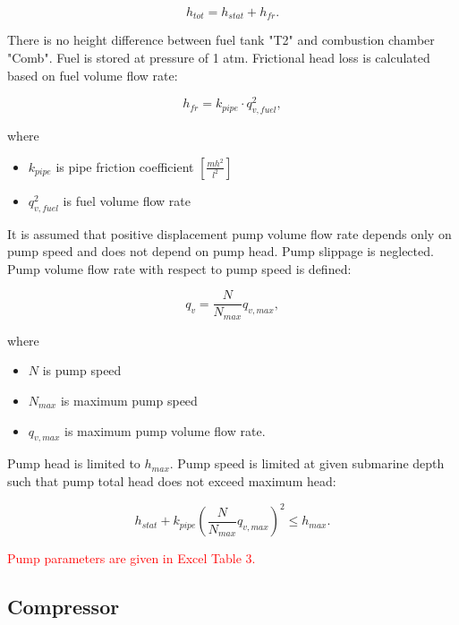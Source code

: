 \documentclass{article}
\begin{document}
	\begin{equation}\label{eq:head_total}
		h_{tot} = h_{stat} + h_{fr}.
	\end{equation}
	
	There is no height difference between fuel tank "T2" and combustion chamber 
	"Comb". Fuel is stored at pressure of 1 atm.
	Frictional head loss is calculated based on fuel volume flow rate:
	
	\begin{equation}\label{eq:head_loss}
		h_{fr} = k_{pipe} \cdot q_{v,fuel}^2,
	\end{equation}
	
	\noindent
	where
	
	\begin{itemize}
		\item $k_{pipe}$ is pipe friction coefficient $\left[ \frac{mh^2}{l^2} \right]$
		\item $q_{v,fuel}^2$ is fuel volume flow rate
	\end{itemize}

	\noindent
	It is assumed that positive displacement pump volume flow rate depends only on pump speed and does not depend on pump head. Pump slippage is neglected. Pump volume flow rate with respect to pump speed is defined:
	
	\begin{equation}\label{eq:pump_vol_flow}
		q_v = \frac{N}{N_{max}} q_{v,max},
	\end{equation}
	
	\noindent
	where
	
	\begin{itemize}
		\item $N$ is pump speed
		\item $N_{max}$ is maximum pump speed
		\item $q_{v,max}$ is maximum pump volume flow rate.
	\end{itemize}

	\noindent
	Pump head is limited to $h_{max}$. Pump speed is limited at given submarine depth such that pump total head does not exceed maximum head:
	
	\begin{equation}\label{eq:total_head_limit}
		h_{stat} + k_{pipe} \left( \frac{N}{N_{max}} q_{v,max} \right)^2 \leq h_{max}.
	\end{equation}
	
	\noindent
	\textcolor{red}{Pump parameters are given in Excel Table 3.}
	
	\subsection{Compressor}
	
\end{document}
